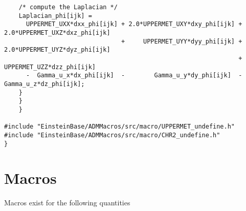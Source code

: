 \begin{verbatim}
    /* compute the Laplacian */
    Laplacian_phi[ijk] =
      UPPERMET_UXX*dxx_phi[ijk] + 2.0*UPPERMET_UXY*dxy_phi[ijk] + 2.0*UPPERMET_UXZ*dxz_phi[ijk]
                                +     UPPERMET_UYY*dyy_phi[ijk] + 2.0*UPPERMET_UYZ*dyz_phi[ijk]
                                                                +     UPPERMET_UZZ*dzz_phi[ijk]
      -  Gamma_u_x*dx_phi[ijk]  -        Gamma_u_y*dy_phi[ijk]  -        Gamma_u_z*dz_phi[ijk];
    }
    }
    }

#include "EinsteinBase/ADMMacros/src/macro/UPPERMET_undefine.h"
#include "EinsteinBase/ADMMacros/src/macro/CHR2_undefine.h"
}
\end{verbatim}
\endgroup


\section{Macros}
\label{admmacros:macros}
Macros exist for the following quantities

